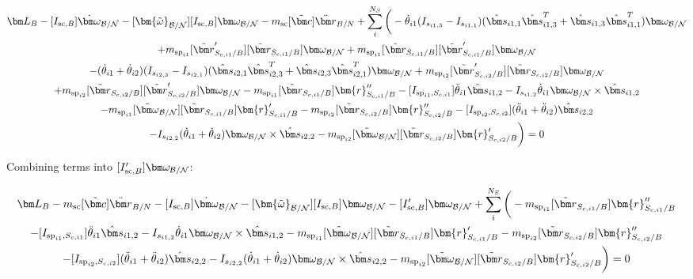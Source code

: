 \begin{multline}
	\bm L_B -[I_{\text{sc},B}] \dot{\bm\omega}_{\cal B/N} -[\bm{\tilde{\omega}}_{\cal B/N}] [I_{\text{sc},B}] \bm\omega_{\cal B/N}
	- m_{\text{sc}} [\tilde{\bm c}] \ddot{\bm r}_{B/N}
	+ \sum\limits_{i}^{N_S}\bigg( -\dot{\theta}_{i1} (I_{s_{i1,3}} - I_{s_{i1,1}})( \hat{\bm s}_{i1,1} \hat{\bm s}_{i1,3}^T + \hat{\bm s}_{i1,3} \hat{\bm s}_{i1,1}^T) \bm \omega_{\cal{B/N}} \\
	+ m_{\text{sp}_{i1}} [\tilde{{\bm r}}'_{S_{c,i1}/B}] [\tilde{{\bm r}}_{S_{c,i1}/B}] \bm\omega_{\cal B/N} + m_{\text{sp}_{i1}} [\tilde{{\bm r}}_{S_{c,i1}/B}] [\tilde{{\bm r}}'_{S_{c,i1}/B}] \bm\omega_{\cal B/N} \\
	-(\dot{\theta}_{i1}  + \dot{\theta}_{i2})(I_{s_{i2,3}} - I_{s_{i2,1}}) (\hat{\bm s}_{i2,1} \hat{\bm s}_{i2,3}^T + \hat{\bm s}_{i2,3} \hat{\bm s}_{i2,1}^T) \bm \omega_{\cal{B/N}}
	+ m_{\text{sp}_{i2}} [\tilde{{\bm r}}'_{S_{c,i2}/B}] [\tilde{{\bm r}}_{S_{c,i2}/B}] \bm\omega_{\cal B/N} \\
	+  m_{\text{sp}_{i2}} [\tilde{{\bm r}}_{S_{c,i2}/B}] [\tilde{{\bm r}}'_{S_{c,i2}/B}] \bm\omega_{\cal B/N}
	- m_{\text{sp}_{i1}} [\tilde{{\bm r}}_{S_{c,i1}/B}] \bm{r}''_{S_{c,i1}/B}
	-[I_{\text{sp}_{i1},S_{c,i1}}] \ddot{\theta}_{i1} \hat{\bm s}_{i1,2}
	-I_{s_{i1,2}} \dot{\theta}_{i1} \bm \omega_{\cal{B/N}} \times \hat{\bm s}_{i1,2} \\
	- m_{\text{sp}_{i1}} [\tilde{\bm\omega}_{\cal B/N}] [\tilde{{\bm r}}_{S_{c,i1}/B}] \bm{r}'_{S_{c,i1}/B}
	- m_{\text{sp}_{i2}} [\tilde{{\bm r}}_{S_{c,i2}/B}] \bm{r}''_{S_{c,i2}/B}
	-[I_{\text{sp}_{i2},S_{c,i2}}] (\ddot{\theta}_{i1}  + \ddot{\theta}_{i2})\hat{\bm s}_{i2,2}
	\\
	-I_{s_{i2,2}}  (\dot{\theta}_{i1}  + \dot{\theta}_{i2}) \bm \omega_{\cal{B/N}} \times \hat{\bm s}_{i2,2}
	- m_{\text{sp}_{i2}} [\tilde{\bm\omega}_{\cal B/N}] [\tilde{{\bm r}}_{S_{c,i2}/B}] \bm{r}'_{S_{c,i2}/B} \bigg) = 0
\end{multline}

Combining terms into $[I'_{\text{sc},B}] \bm\omega_{\cal B/N}$:

\begin{multline}
	\bm L_B - m_{\text{sc}} [\tilde{\bm c}] \ddot{\bm r}_{B/N} -[I_{\text{sc},B}] \dot{\bm\omega}_{\cal B/N} -[\bm{\tilde{\omega}}_{\cal B/N}] [I_{\text{sc},B}] \bm\omega_{\cal B/N} - [I'_{\text{sc},B}] \bm\omega_{\cal B/N}
	+ \sum\limits_{i}^{N_S}\bigg(
	- m_{\text{sp}_{i1}} [\tilde{{\bm r}}_{S_{c,i1}/B}] \bm{r}''_{S_{c,i1}/B}
	\\
	-[I_{\text{sp}_{i1},S_{c,i1}}] \ddot{\theta}_{i1} \hat{\bm s}_{i1,2}
	-I_{s_{i1,2}} \dot{\theta}_{i1} \bm \omega_{\cal{B/N}} \times \hat{\bm s}_{i1,2} - m_{\text{sp}_{i1}} [\tilde{\bm\omega}_{\cal B/N}] [\tilde{{\bm r}}_{S_{c,i1}/B}] \bm{r}'_{S_{c,i1}/B}
	- m_{\text{sp}_{i2}} [\tilde{{\bm r}}_{S_{c,i2}/B}] \bm{r}''_{S_{c,i2}/B}\\
	-[I_{\text{sp}_{i2},S_{c,i2}}] (\ddot{\theta}_{i1}  + \ddot{\theta}_{i2})\hat{\bm s}_{i2,2}
	-I_{s_{i2,2}}  (\dot{\theta}_{i1}  + \dot{\theta}_{i2}) \bm \omega_{\cal{B/N}} \times \hat{\bm s}_{i2,2} - m_{\text{sp}_{i2}} [\tilde{\bm\omega}_{\cal B/N}] [\tilde{{\bm r}}_{S_{c,i2}/B}] \bm{r}'_{S_{c,i2}/B} \bigg) = 0
\end{multline}

